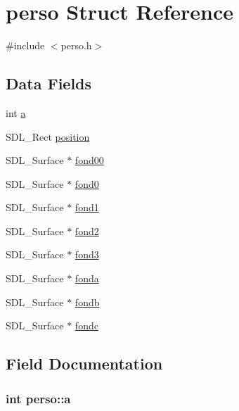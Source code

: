 \hypertarget{structperso}{}\section{perso Struct Reference}
\label{structperso}


{\ttfamily \#include $<$perso.\+h$>$}

\subsection*{Data Fields}
\begin{DoxyCompactItemize}
\item 
int \hyperlink{structperso_afd06df60ee01ab1d69546cca298386d2}{a}
\item 
S\+D\+L\+\_\+\+Rect \hyperlink{structperso_a74aed265eb926987cf218b19d163c746}{position}
\item 
S\+D\+L\+\_\+\+Surface $\ast$ \hyperlink{structperso_abc00c1912b93daeeb58e8e2c1d84fb09}{fond00}
\item 
S\+D\+L\+\_\+\+Surface $\ast$ \hyperlink{structperso_a08c74faf3f88be57cf3a74045d4516b4}{fond0}
\item 
S\+D\+L\+\_\+\+Surface $\ast$ \hyperlink{structperso_ad396706f66a5d6c81b71a27b2eec9e02}{fond1}
\item 
S\+D\+L\+\_\+\+Surface $\ast$ \hyperlink{structperso_ac0a45d49ba5381c604c01a39596e55f7}{fond2}
\item 
S\+D\+L\+\_\+\+Surface $\ast$ \hyperlink{structperso_a6445f715e75440295b6acb1e6975fcb9}{fond3}
\item 
S\+D\+L\+\_\+\+Surface $\ast$ \hyperlink{structperso_aad23cb6acdce0282ea32c0ed5d807809}{fonda}
\item 
S\+D\+L\+\_\+\+Surface $\ast$ \hyperlink{structperso_a436b5abedfc6ba00785a3cf4ff6bc32c}{fondb}
\item 
S\+D\+L\+\_\+\+Surface $\ast$ \hyperlink{structperso_ac022be57eda44dffb7cd61238105d829}{fondc}
\end{DoxyCompactItemize}


\subsection{Field Documentation}
\subsubsection[{\texorpdfstring{a}{a}}]{\setlength{\rightskip}{0pt plus 5cm}int perso\+::a}\hypertarget{structperso_afd06df60ee01ab1d69546cca298386d2}{}\label{structperso_afd06df60ee01ab1d69546cca298386d2}
